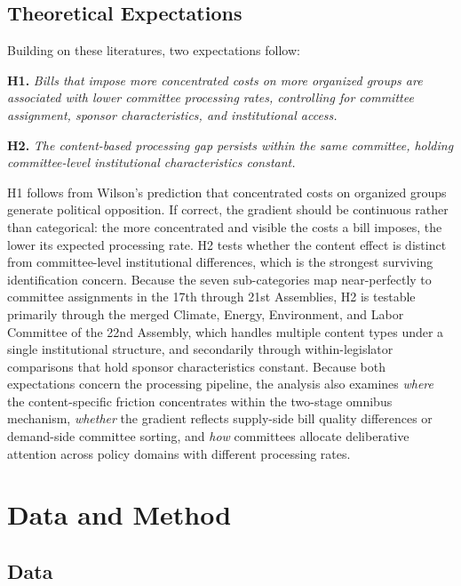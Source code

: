 \documentclass[11pt]{article}
\begin{document}
\subsection{Theoretical Expectations}

Building on these literatures, two expectations follow:

\medskip
\noindent\textbf{H1.} \textit{Bills that impose more concentrated costs on more organized groups are associated with lower committee processing rates, controlling for committee assignment, sponsor characteristics, and institutional access.}

\medskip
\noindent\textbf{H2.} \textit{The content-based processing gap persists within the same committee, holding committee-level institutional characteristics constant.}

\medskip
\noindent H1 follows from Wilson's prediction that concentrated costs on organized groups generate political opposition. If correct, the gradient should be continuous rather than categorical: the more concentrated and visible the costs a bill imposes, the lower its expected processing rate. H2 tests whether the content effect is distinct from committee-level institutional differences, which is the strongest surviving identification concern. Because the seven sub-categories map near-perfectly to committee assignments in the 17th through 21st Assemblies, H2 is testable primarily through the merged Climate, Energy, Environment, and Labor Committee of the 22nd Assembly, which handles multiple content types under a single institutional structure, and secondarily through within-legislator comparisons that hold sponsor characteristics constant. Because both expectations concern the processing pipeline, the analysis also examines \emph{where} the content-specific friction concentrates within the two-stage omnibus mechanism, \emph{whether} the gradient reflects supply-side bill quality differences or demand-side committee sorting, and \emph{how} committees allocate deliberative attention across policy domains with different processing rates.



\section{Data and Method}
\label{sec:method}

\subsection{Data}
\label{sec:data}
\end{document}
